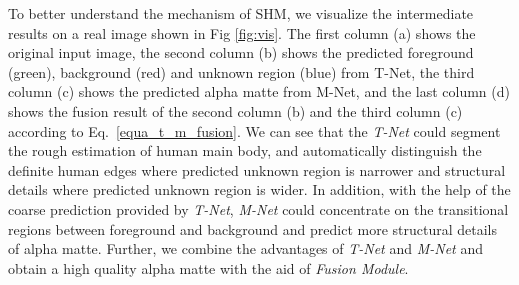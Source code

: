 To better understand the mechanism of SHM, we visualize the intermediate results on a real image shown in Fig \ref{fig:vis}.
The first column (a) shows the original input image, the second column (b) shows the predicted foreground (green), background (red) and unknown region (blue) from T-Net, the third column (c) shows the predicted alpha matte from M-Net, and the last column (d) shows the fusion result of the second column (b) and the third column (c) according to Eq.~\ref{equa_t_m_fusion}.
We can see that the \emph{T-Net} could segment the rough estimation of human main body, and automatically distinguish the definite human edges where predicted unknown region is narrower and structural details where predicted unknown region is wider.
In addition, with the help of the coarse prediction provided by \emph{T-Net}, \emph{M-Net} could concentrate on the transitional regions between foreground and background and predict more structural details of alpha matte.
Further, we combine the advantages of \emph{T-Net} and \emph{M-Net} and obtain a high quality alpha matte with the aid of \emph{Fusion Module}.












